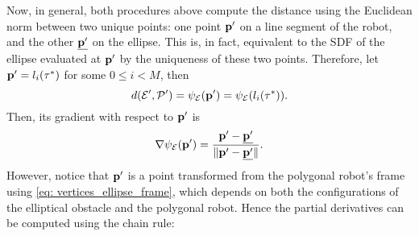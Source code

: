 Now, in general, both procedures above compute the distance using the Euclidean norm between two unique points: one point $\mathbf{p}'$ on a line segment of the robot, and the other $\underline{\mathbf{p}'}$ on the ellipse. This is, in fact, equivalent to the SDF of the ellipse evaluated at $\mathbf{p}'$ by the uniqueness of these two points. Therefore, let $\mathbf{p}' = l_i(\tau^*)$ for some $0 \leq i < M$, then 
\begin{equation}
    d({\cal E}', {\cal P}') = \psi_{\cal E}(\mathbf{p}') = \psi_{\cal E}(l_i(\tau^*)).
\end{equation}
Then, its gradient with respect to $\mathbf{p}'$ is
\begin{equation}
\label{eq: ellipse_to_point_gradient}
    \nabla \psi_{\cal E}(\mathbf{p}') = \frac{\mathbf{p}' - \underline{\mathbf{p}'}}{\| \mathbf{p}' - \underline{\mathbf{p}'} \|}.
\end{equation}
However, notice that $\mathbf{p}'$ is a point transformed from the polygonal robot's frame using \eqref{eq: vertices_ellipse_frame}, which depends on both the configurations of the elliptical obstacle and the polygonal robot. Hence the partial derivatives can be computed using the chain rule:


